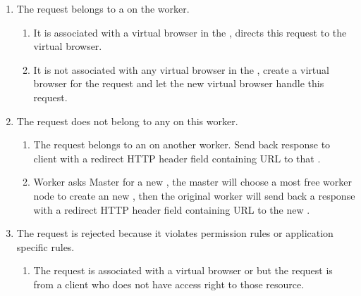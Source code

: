 \begin{enumerate}
    \item The request belongs to a \appins{} on the worker.
    \begin{enumerate}
        \item It is associated with a virtual browser in the \appins{}, directs this request to the virtual browser.
        \item It is not associated with any virtual browser in the \appins{}, create a virtual browser for the request
        and let the new virtual browser handle this request.
    \end{enumerate}

    \item The request does not belong to any \appins{} on this worker.
    \begin{enumerate}
        \item The request belongs to an \appins{} on another worker.
        Send back response to client with a redirect HTTP header field
        containing URL to that \appins{}.
        \item Worker asks Master for a new \appins{},
        the master will choose a most free worker node to create an new \appins{},
        then the original worker will send back a response with a redirect HTTP header field
        containing URL to the new \appins{}.
    \end{enumerate}

    \item The request is rejected because it violates permission rules or application specific rules.
    \begin{enumerate}
        \item The request is associated with a virtual browser or \appins{} but
        the request is from a client who does not have access right to those resource.
    \end{enumerate}
\end{enumerate}


